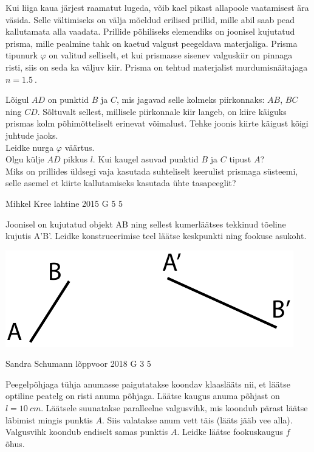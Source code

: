 \documentclass[11pt, twoside]{article}
\begin{document}
{{Kui liiga kaua järjest raamatut lugeda, võib kael pikast allapoole vaatamisest ära väsida. Selle vältimiseks on välja mõeldud erilised prillid, mille abil saab pead kallutamata alla vaadata. Prillide põhiliseks elemendiks on joonisel kujutatud prisma, mille pealmine tahk on kaetud valgust peegeldava materjaliga. Prisma tipunurk $\varphi$ on valitud selliselt, et kui prismasse sisenev valguskiir on pinnaga risti, siis on seda ka väljuv kiir. Prisma on tehtud materjalist murdumisnäitajaga $n=\SI{1,5}{}$. 

\osa Lõigul $AD$ on punktid $B$ ja $C$, mis jagavad selle kolmeks piirkonnaks: $AB$, $BC$ ning $CD$. Sõltuvalt sellest, millisele piirkonnale kiir langeb, on kiire käiguks prismas kolm põhimõtteliselt erinevat võimalust. Tehke joonis kiirte käigust kõigi juhtude jaoks.\\
\osa Leidke nurga $\varphi$ väärtus.\\
\osa Olgu külje $AD$ pikkus $l$. Kui kaugel asuvad punktid $B$ ja $C$ tipust $A$?\\
\osa Miks on prillides üldsegi vaja kasutada suhteliselt keerulist prismaga süsteemi, selle asemel et kiirte kallutamiseks kasutada ühte tasapeeglit?
\fi
}

{Mihkel Kree} %
{lahtine} %
{2015} %
{G 5} %
{5} %
{
\ifStatement
Joonisel on kujutatud objekt AB ning sellest kumerläätses tekkinud tõeline kujutis A'B'. Leidke konstrueerimise teel läätse keskpunkti ning fookuse asukoht.

\begin{center}
 \includegraphics[width=0.7\linewidth]{2015-lahg-05-laatsMihkel.pdf}
\end{center}
\fi
}

{Sandra Schumann} %
{lõppvoor} %
{2018} %
{G 3} %
{5} %
{
\ifStatement
Peegelpõhjaga tühja anumasse paigutatakse koondav klaaslääts nii, et läätse optiline peatelg on risti anuma põhjaga. Läätse kaugus anuma põhjast on $l=\SI{10}{cm}$. Läätsele suunatakse paralleelne valgusvihk, mis koondub pärast läätse läbimist mingis punktis $A$. Siis valatakse anum vett täis (lääts jääb vee alla). Valgusvihk koondub endiselt samas punktis $A$. Leidke läätse fookuskaugus $f$ õhus.

}}
\end{document}
